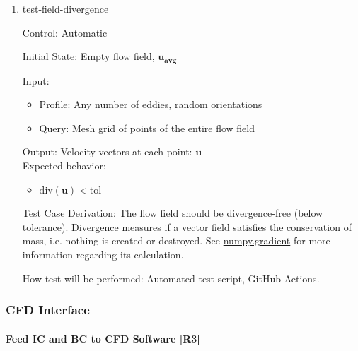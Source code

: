 \documentclass[12pt, titlepage]{article}
\begin{document}
\begin{enumerate}

  \item{test-field-divergence\\}

  Control: Automatic
            
  Initial State: Empty flow field, $\mathbf{u_{avg}}$
            
  Input:
  \begin{itemize}
    \item Profile: Any number of eddies, random orientations
    \item Query: Mesh grid of points of the entire flow field
  \end{itemize}
  Output: Velocity vectors at each point: $\mathbf{u}$\\
  Expected behavior:
  \begin{itemize}
    \item $\text{div}(\mathbf{u}) < \text{tol}$
  \end{itemize}

  Test Case Derivation: The flow field should be divergence-free (below tolerance). Divergence measures if a vector field satisfies the conservation of mass, i.e. nothing is created or destroyed. See \href{https://numpy.org/doc/stable/reference/generated/numpy.gradient.html}{numpy.gradient} for more information regarding its calculation.

  How test will be performed: Automated test script, GitHub Actions.

\end{enumerate}

\subsubsection{CFD Interface} \label{ST:CFD}
\paragraph{Feed IC and BC to CFD Software [R3]\\}
\end{document}
